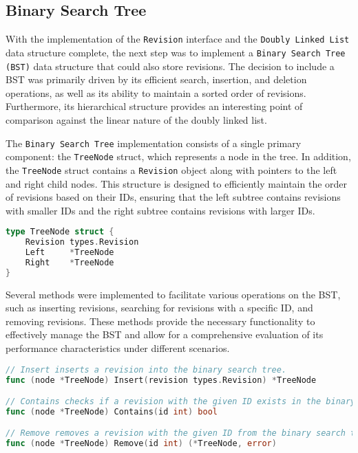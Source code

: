 \subsection{Binary Search Tree}
With the implementation of the \lstinline{Revision} interface and the \lstinline{Doubly Linked List} data structure complete, the next step was to implement a \lstinline{Binary Search Tree (BST)} data structure that could also store revisions. The decision to include a BST was primarily driven by its efficient search, insertion, and deletion operations, as well as its ability to maintain a sorted order of revisions. Furthermore, its hierarchical structure provides an interesting point of comparison against the linear nature of the doubly linked list.
\smallskip

The \lstinline{Binary Search Tree} implementation consists of a single primary component: the \lstinline{TreeNode} struct, which represents a node in the tree. In addition, the \lstinline{TreeNode} struct contains a \lstinline{Revision} object along with pointers to the left and right child nodes. This structure is designed to efficiently maintain the order of revisions based on their IDs, ensuring that the left subtree contains revisions with smaller IDs and the right subtree contains revisions with larger IDs.

\begin{lstlisting}[language=go]
type TreeNode struct {
	Revision types.Revision
	Left     *TreeNode
	Right    *TreeNode
}
\end{lstlisting}
\medskip

Several methods were implemented to facilitate various operations on the BST, such as inserting revisions, searching for revisions with a specific ID, and removing revisions. These methods provide the necessary functionality to effectively manage the BST and allow for a comprehensive evaluation of its performance characteristics under different scenarios.

\begin{lstlisting}[language=go]
// Insert inserts a revision into the binary search tree.
func (node *TreeNode) Insert(revision types.Revision) *TreeNode

// Contains checks if a revision with the given ID exists in the binary search tree.
func (node *TreeNode) Contains(id int) bool

// Remove removes a revision with the given ID from the binary search tree.
func (node *TreeNode) Remove(id int) (*TreeNode, error)
\end{lstlisting}
\medskip


